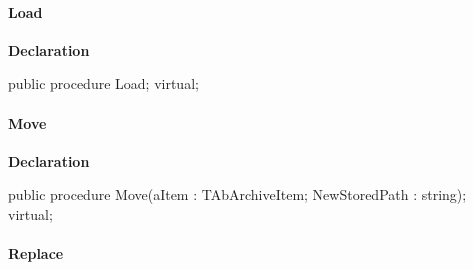 \documentclass{report}
\newif\ifpdf
\begin{document}
\paragraph*{Load}\hspace*{\fill}

\label{AbArcTyp.TAbArchive-Load}
\begin{list}{}{
\setlength{\itemindent}{0cm}
\setlength{\listparindent}{0cm}
\setlength{\leftmargin}{\evensidemargin}
\addtolength{\leftmargin}{\tmplength}
\settowidth{\labelsep}{X}
\addtolength{\leftmargin}{\labelsep}
\setlength{\labelwidth}{\tmplength}
}
\item[\textbf{Declaration}\hfill]
\ifpdf
\begin{flushleft}
\fi
\begin{ttfamily}
public procedure Load; virtual;\end{ttfamily}

\ifpdf
\end{flushleft}
\fi

\end{list}
\paragraph*{Move}\hspace*{\fill}

\label{AbArcTyp.TAbArchive-Move}
\begin{list}{}{
\setlength{\itemindent}{0cm}
\setlength{\listparindent}{0cm}
\setlength{\leftmargin}{\evensidemargin}
\addtolength{\leftmargin}{\tmplength}
\settowidth{\labelsep}{X}
\addtolength{\leftmargin}{\labelsep}
\setlength{\labelwidth}{\tmplength}
}
\item[\textbf{Declaration}\hfill]
\ifpdf
\begin{flushleft}
\fi
\begin{ttfamily}
public procedure Move(aItem : TAbArchiveItem; NewStoredPath : string); virtual;\end{ttfamily}

\ifpdf
\end{flushleft}
\fi

\end{list}
\paragraph*{Replace}\hspace*{\fill}
\end{document}
